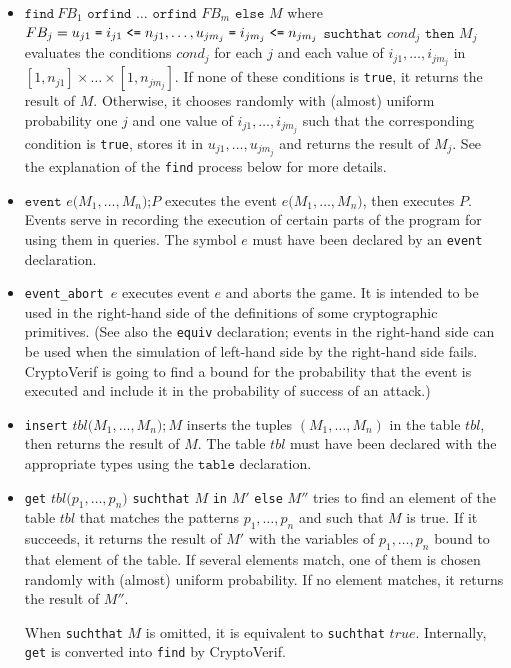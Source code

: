 \begin{itemize}
\item 
$\texttt{find}\ FB_1 \texttt{ orfind }\ldots\texttt{ orfind }FB_m \texttt{ else } M$ where $FB_j = u_{j1} \mathrel{\texttt{=}}  i_{j1} \mathrel{\texttt{<=}}  n_{j1}, \ldots, u_{jm_j} \mathrel{\texttt{=}}  i_{jm_j} \mathrel{\texttt{<=}}  n_{jm_j}$ $\texttt{suchthat}$ $cond_j$ $\texttt{then}$ $M_j$
evaluates the conditions
$cond_j$ for each $j$ and
each value of $i_{j1}, \ldots, i_{jm_j}$ in $[1, n_{j1}] 
\times \ldots \times [1, n_{jm_j}]$.
If none of these conditions is \texttt{true}, it returns the result of $M$.
Otherwise, it chooses randomly with (almost) uniform probability
one $j$ and one value of $i_{j1}, \ldots, i_{jm_j}$
such that the corresponding condition is \texttt{true},
stores it in $u_{j1}, \ldots, u_{jm_j}$ and returns 
the result of $M_j$.
See the explanation of the {\tt find} process below for more details.

\item $\texttt{event }e\texttt{(}M_1, \ldots, M_n\texttt{);}P$ executes the
event $e\texttt{(}M_1, \ldots, M_n\texttt{)}$, then executes $P$.
Events serve in recording the execution of certain parts of the program
for using them in queries. The symbol $e$ must have been declared
by an \texttt{event} declaration.

\item \texttt{event\string_abort $e$} executes event $e$ and aborts the game.
It is intended to be used in the right-hand side
of the definitions of some cryptographic primitives. (See also
the \texttt{equiv} declaration; events in the right-hand side can be
used when the simulation of left-hand side by the right-hand side
fails. CryptoVerif is going to find a bound for the probability that the event is
executed and include it in the probability of success of an attack.)

\item \texttt{insert} $\mathit{tbl}\texttt{(}M_1, \ldots, M_n\texttt{)}; M$
inserts the tuples $(M_1, \ldots, M_n)$ in the table $\mathit{tbl}$, 
then returns the result of $M$.
The table $\mathit{tbl}$ must have been declared with the appropriate
types using the $\texttt{table}$ declaration.

\item \texttt{get} $\mathit{tbl}\texttt{(}p_1, \ldots, p_n\texttt{)}$ \texttt{suchthat} $M$ \texttt{in} $M'$ \texttt{else} $M''$ tries to find an element of the table $\mathit{tbl}$ that matches the patterns $p_1, \ldots, p_n$ and such that $M$ is true. If it succeeds, it returns the result of $M'$ with the variables of $p_1, \ldots, p_n$ bound to that element of the table. If several elements match, one of them is chosen randomly with (almost) uniform probability. If no element matches, it returns the result of $M''$. 

When \texttt{suchthat} $M$ is omitted, it is equivalent to \texttt{suchthat} $\mathit{true}$. Internally, \texttt{get} is converted into \texttt{find} by CryptoVerif.

\end{itemize}

